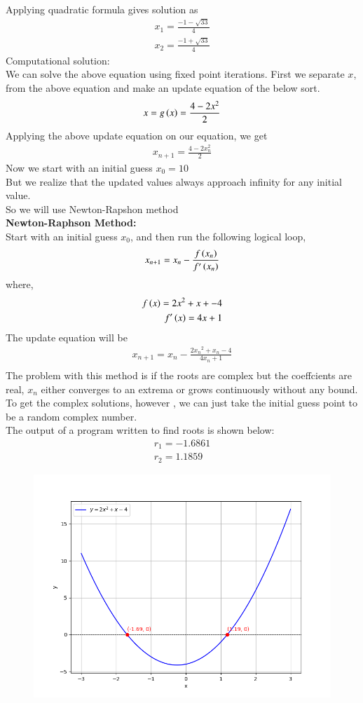 \documentclass[journal]{IEEEtran}
\begin{document}
Applying quadratic formula gives solution as
\begin{align}
	x_1 = \frac{-1-\sqrt{33}}{4}\\
	x_2 = \frac{-1+\sqrt{33}}{4}
\end{align}
Computational solution:\\
We can solve the above equation using fixed point iterations. First we separate $x$, from the above equation and make an update equation of the below sort.
\begin{align}
	x = g\left(x\right) = \frac{4-2x^2}{2}
\end{align}
Applying the above update equation on our equation, we get
\begin{align}
	x_{n+1}=\frac{4-2x^2_n}{2}
\end{align}
Now we start with an initial guess $x_0 = 10 $\\
But we realize that the updated values always approach infinity for any initial value. \\
So we will use Newton-Rapshon method\\
\textbf{Newton-Raphson Method:}\\
Start with an initial guess $x_0$, and then run the following logical loop,
\begin{align}
    x_{n+1} = x_n - \frac{f\left(x_n\right)}{f^{\prime}\left(x_n\right)} 
\end{align}
where,
\begin{align}
    f\left(x\right) = 2x^2 + x + -4\\
    f^{\prime}\left(x\right) = 4x+1
\end{align}
The update equation will be
\begin{align}
	x_{n+1} = x_n - \frac{2{x_n}^2 + x_n - 4}{4x_n+1}\\
\end{align}
The problem with this method is if the roots are complex but the coeffcients are real, $x_n$ either converges to an extrema or grows continuously without any bound.
To get the complex solutions, however , we can just take the initial guess point to be a 
random complex number.\\
The output of a program written to find roots is shown below:
\begin{align}
	r_1 =-1.6861 \\
	r_2 = 1.1859
\end{align}
\begin{figure}[!ht]
    \centering
    \includegraphics[width=\columnwidth]{figs/Figure_1.png}
    \caption{}
\end{figure}
\end{document}
